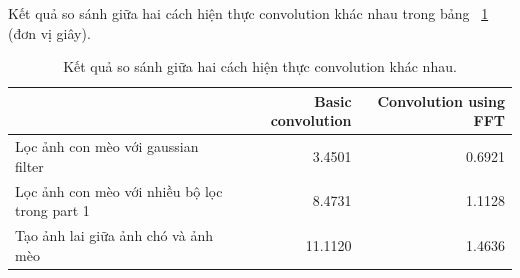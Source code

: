 Kết quả so sánh giữa hai cách hiện thực convolution khác nhau trong bảng ~\ref{tab:table1} (đơn vị giây).

\begin{table}[h]
    \centering
    \begin{tabular}{|l|r|r|}
        \hline
                        & Basic convolution & Convolution using FFT\\
        \hline
        Lọc ảnh con mèo với gaussian filter & 3.4501  & 0.6921 \\
        \hline
        Lọc ảnh con mèo với nhiều bộ lọc trong part 1 & 8.4731  & 1.1128 \\
        \hline
        Tạo ảnh lai giữa ảnh chó và ảnh mèo & 11.1120  & 1.4636 \\
        \hline
    \end{tabular}
    \caption{Kết quả so sánh giữa hai cách hiện thực convolution khác nhau.}
    \label{tab:table1}
\end{table}


